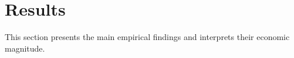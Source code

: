 \section{Results} \label{sec:results}

This section presents the main empirical findings and interprets their economic magnitude.
